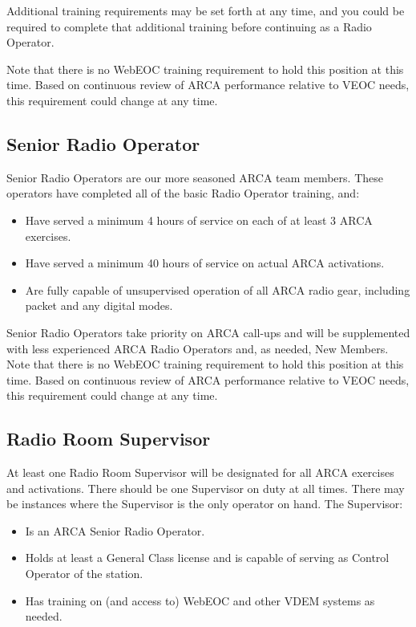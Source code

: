 \documentclass[pdflatex,letterpaper,twoside,12pt]{book}
\begin{document}
Additional training requirements may be set forth at any time, and you could be required to complete that additional training before continuing as a Radio Operator.

Note that there is no WebEOC training requirement to hold this position at this time.  Based on continuous review of ARCA performance relative to VEOC needs, this requirement could change at any time.

\subsection{Senior Radio Operator}

Senior Radio Operators are our more seasoned ARCA team members.  These operators have completed all of the basic Radio Operator training, and:

\begin{itemize}
	\item Have served a minimum 4 hours of service on each of at least 3 ARCA exercises.
	\item Have served a minimum 40 hours of service on actual ARCA activations.
	\item Are fully capable of unsupervised operation of all ARCA radio gear, including packet and any digital modes.
\end{itemize}

Senior Radio Operators take priority on ARCA call-ups and will be supplemented with less experienced ARCA Radio Operators and, as needed, New Members.
Note that there is no WebEOC training requirement to hold this position at this time.  Based on continuous review of ARCA performance relative to VEOC needs, this requirement could change at any time.

\subsection{Radio Room Supervisor}

At least one Radio Room Supervisor will be designated for all ARCA exercises and activations.  There should be one Supervisor on duty at all times.  There may be instances where the Supervisor is the only operator on hand.  The Supervisor:

\begin{itemize}
	\item Is an ARCA Senior Radio Operator.
	\item Holds at least a General Class license and is capable of serving as Control Operator of the station.
	\item Has training on (and access to) WebEOC and other VDEM systems as needed.
\end{itemize}
\end{document}
